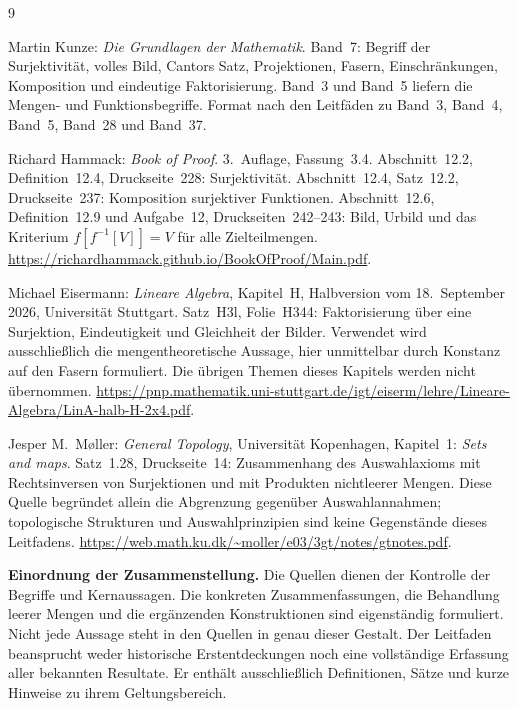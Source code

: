 \renewcommand{\bibname}{Quellen und Bandzuordnung}
\begin{thebibliography}{9}
\footnotesize
\setlength{\itemsep}{4pt}
\setlength{\parskip}{0pt}

Martin Kunze: \emph{Die Grundlagen der Mathematik}.
Band~7: Begriff der Surjektivität, volles Bild, Cantors Satz,
Projektionen, Fasern, Einschränkungen, Komposition und eindeutige
Faktorisierung. Band~3 und Band~5 liefern die Mengen- und
Funktionsbegriffe. Format nach den Leitfäden zu Band~3,
Band~4, Band~5, Band~28 und Band~37.

Richard Hammack: \emph{Book of Proof}.
3.~Auflage, Fassung~3.4.
Abschnitt~12.2, Definition~12.4, Druckseite~228:
Surjektivität. Abschnitt~12.4, Satz~12.2, Druckseite~237:
Komposition surjektiver Funktionen.
Abschnitt~12.6, Definition~12.9 und Aufgabe~12,
Druckseiten~242--243: Bild, Urbild und das Kriterium
$f[f^{-1}[V]]=V$ für alle Zielteilmengen.
\url{https://richardhammack.github.io/BookOfProof/Main.pdf}.

Michael Eisermann: \emph{Lineare Algebra}, Kapitel~H,
Halbversion vom 18.~September 2026, Universität Stuttgart.
Satz~H3l, Folie~H344: Faktorisierung über eine Surjektion,
Eindeutigkeit und Gleichheit der Bilder.
Verwendet wird ausschließlich die mengentheoretische Aussage,
hier unmittelbar durch Konstanz auf den Fasern formuliert.
Die übrigen Themen dieses Kapitels werden nicht übernommen.
\url{https://pnp.mathematik.uni-stuttgart.de/igt/eiserm/lehre/Lineare-Algebra/LinA-halb-H-2x4.pdf}.

Jesper M.~Møller: \emph{General Topology},
Universität Kopenhagen, Kapitel~1: \emph{Sets and maps}.
Satz~1.28, Druckseite~14: Zusammenhang des Auswahlaxioms
mit Rechtsinversen von Surjektionen und mit Produkten
nichtleerer Mengen. Diese Quelle begründet allein die
Abgrenzung gegenüber Auswahlannahmen; topologische Strukturen
und Auswahlprinzipien sind keine Gegenstände dieses Leitfadens.
\url{https://web.math.ku.dk/~moller/e03/3gt/notes/gtnotes.pdf}.

\end{thebibliography}

\noindent\textbf{Einordnung der Zusammenstellung.}
Die Quellen dienen der Kontrolle der Begriffe und Kernaussagen.
Die konkreten Zusammenfassungen, die Behandlung leerer Mengen
und die ergänzenden Konstruktionen sind eigenständig formuliert.
Nicht jede Aussage steht in den Quellen in genau dieser Gestalt.
Der Leitfaden beansprucht weder historische Erstentdeckungen
noch eine vollständige Erfassung aller bekannten Resultate.
Er enthält ausschließlich Definitionen, Sätze und kurze Hinweise
zu ihrem Geltungsbereich.
